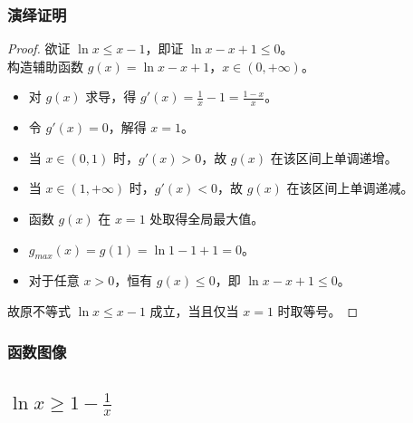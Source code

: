 \documentclass[a4paper,12pt]{ctexart}
\theoremstyle{mytheoremstyle}
\begin{document}
\subsubsection*{\textcolor{MyGreen}{演绎证明}}
\begin{proof}
欲证 $\ln x \le x-1$，即证 $\ln x - x + 1 \le 0$。\\
构造辅助函数 $g(x) = \ln x - x + 1$，$x \in (0, +\infty)$。
\begin{itemize}
    \item[∵] 对 $g(x)$ 求导，得 $g'(x) = \frac{1}{x} - 1 = \frac{1-x}{x}$。
    \item[∵] 令 $g'(x) = 0$，解得 $x=1$。
    \item[∵] 当 $x \in (0, 1)$ 时，$g'(x) > 0$，故 $g(x)$ 在该区间上单调递增。
    \item[∵] 当 $x \in (1, +\infty)$ 时，$g'(x) < 0$，故 $g(x)$ 在该区间上单调递减。
    \item[∴] 函数 $g(x)$ 在 $x=1$ 处取得全局最大值。
    \item[∵] $g_{max}(x) = g(1) = \ln 1 - 1 + 1 = 0$。
    \item[∴] 对于任意 $x > 0$，恒有 $g(x) \le 0$，即 $\ln x - x + 1 \le 0$。
\end{itemize}
故原不等式 $\ln x \le x-1$ 成立，当且仅当 $x=1$ 时取等号。
\end{proof}

\subsubsection*{\textcolor{MyGreen}{函数图像}}
\begin{center}
\end{center}

\newpage
\subsection{\textcolor{MyPurple}{$\ln x \ge 1 - \frac{1}{x}$}}
\end{document}
